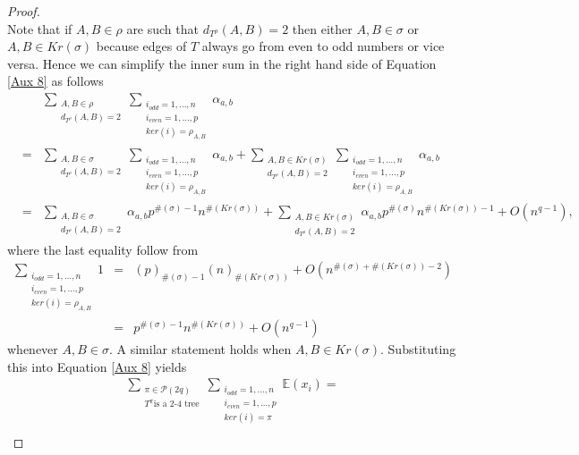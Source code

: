 \documentclass{article}
\theoremstyle{definition}
\newcommand{\E}{\mathbb{E}}
\newcommand{\cP}{\mathcal{P}}
\begin{document}
{\begin{proof}
\begin{equation}
\end{equation}
Note that if $A,B\in \rho$ are such that $d_{T^\rho}(A,B)=2$ then either $A,B\in \sigma$ or $A,B\in Kr(\sigma)$ because edges of $T$ always go from even to odd numbers or vice versa. Hence we can simplify the inner sum in the right hand side of Equation \ref{Aux 8} as follows
\begin{eqnarray*}
&&\sum_{\substack{A,B\in \rho \\ d_{T^\rho}(A,B)=2}}\sum_{\substack{i_{odd}=1,\dots,n \\ i_{even}=1,\dots,p \\ ker(i)=\rho_{A,B}}}\alpha_{a,b} \\
&=& \sum_{\substack{A,B\in \sigma \\ d_{T^\rho}(A,B)=2}}\sum_{\substack{i_{odd}=1,\dots,n \\ i_{even}=1,\dots,p \\ ker(i)=\rho_{A,B}}}\alpha_{a,b} + \sum_{\substack{A,B\in Kr(\sigma) \\ d_{T^\rho}(A,B)=2}}\sum_{\substack{i_{odd}=1,\dots,n \\ i_{even}=1,\dots,p \\ ker(i)=\rho_{A,B}}}\alpha_{a,b} \\
&=& \sum_{\substack{A,B\in \sigma \\ d_{T^\rho}(A,B)=2}}\alpha_{a,b}p^{\#(\sigma)-1}n^{\#(Kr(\sigma))} + \sum_{\substack{A,B\in Kr(\sigma) \\ d_{T^\rho}(A,B)=2}}\alpha_{a,b}p^{\#(\sigma)}n^{\#(Kr(\sigma))-1}+O(n^{q-1}), 
\end{eqnarray*}
where the last equality follow from
\begin{eqnarray*}
\sum_{\substack{i_{odd}=1,\dots,n \\ i_{even}=1,\dots,p \\ ker(i)=\rho_{A,B}}}1 &=& (p)_{\#(\sigma)-1}(n)_{\#(Kr(\sigma))}+O(n^{\#(\sigma)+\#(Kr(\sigma))-2}) \\
&=& p^{\#(\sigma)-1}n^{\#(Kr(\sigma))}+O(n^{q-1})
\end{eqnarray*}
whenever $A,B\in \sigma$. A similar statement holds when $A,B\in Kr(\sigma)$. Substituting this into Equation \ref{Aux 8} yields
\begin{multline}
\sum_{\substack{\pi\in \cP(2q)\\ T^\pi \text{is a 2-4 tree} }}\sum_{\substack{i_{odd}=1,\dots,n \\ i_{even}=1,\dots,p \\ ker(i)=\pi}}\E(x_i)= \\

\end{multline}
\end{proof}}
\end{document}

